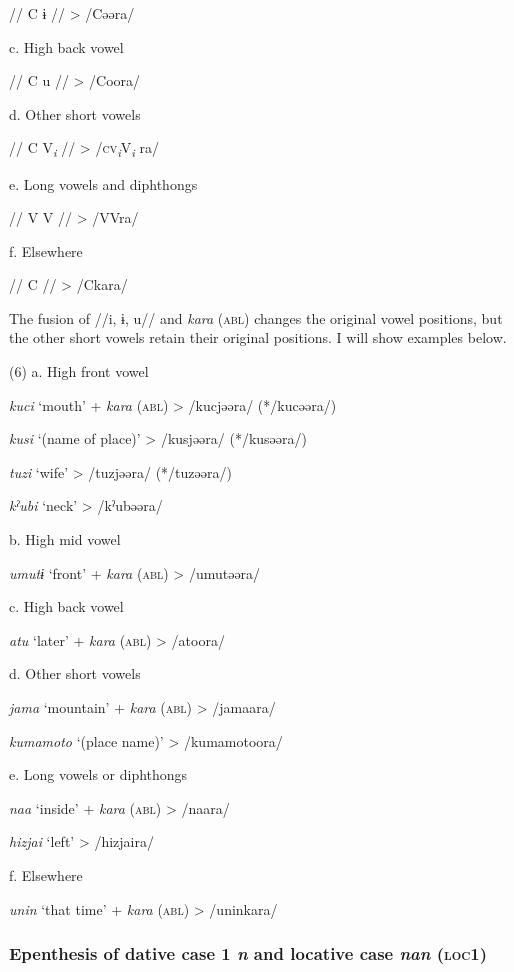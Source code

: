    //  C  ɨ  //      >  /Cəəra/

  c.  High back vowel

    //  C  u  //      >  /Coora/

  d.  Other short vowels

    //  C  V\textit{\textsubscript{i}}  //      >  /\textsc{cv}\textit{\textsubscript{i}}V\textit{\textsubscript{i} }ra/

  e.  Long vowels and diphthongs

    //  V  V  //      >  /VVra/

  f.  Elsewhere

    //  C  //        >  /Ckara/

The fusion of //i, ɨ, u// and \textit{kara} (\textsc{abl}) changes the original vowel positions, but the other short vowels retain their original positions. I will show examples below.

(6)  a.  High front vowel  

    \textit{kuci}  ‘mouth’  +  \textit{kara} (\textsc{abl})  >  /kucjəəra/  (*/kucəəra/)

    \textit{kusi}  ‘(name of place)’      >  /kusjəəra/  (*/kusəəra/)

    \textit{tuzi}  ‘wife’      >  /tuzjəəra/  (*/tuzəəra/)

    \textit{kˀubi}  ‘neck’      >  /kˀubəəra/  

  b.  High mid vowel

    \textit{umutɨ}  ‘front’  +  \textit{kara} (\textsc{abl})  >  /umutəəra/

  c.  High back vowel  

    \textit{atu}  ‘later’  +  \textit{kara} (\textsc{abl})  >  /atoora/

  d.  Other short vowels

    \textit{jama}  ‘mountain’  +  \textit{kara} (\textsc{abl})  >  /jamaara/

    \textit{kumamoto}  ‘(place name)’      >  /kumamotoora/  

  e.  Long vowels or diphthongs  

    \textit{naa}  ‘inside’  +  \textit{kara} (\textsc{abl})  >  /naara/

    \textit{hizjai}  ‘left’      >  /hizjaira/  

  f.  Elsewhere

    \textit{unin}  ‘that time’  +  \textit{kara} (\textsc{abl})  >  /uninkara/

\subsubsection{Epenthesis of dative case 1 \textit{n} and locative case \textit{nan} (\textsc{loc}1)}

